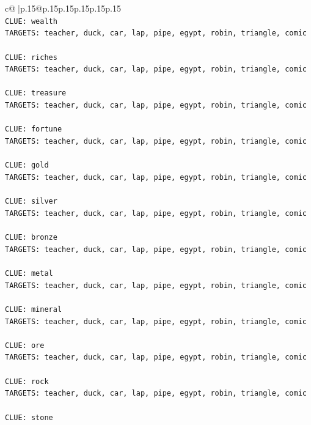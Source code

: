 \documentclass{article}
\begin{document}
{\begin{supertabular}{c@{$\;$}|p{.15\linewidth}@{}p{.15\linewidth}p{.15\linewidth}p{.15\linewidth}p{.15\linewidth}p{.15\linewidth}}
{{{\\ 
\texttt{CLUE: wealth} \\
\texttt{TARGETS: teacher, duck, car, lap, pipe, egypt, robin, triangle, comic} \\
\\ 
\texttt{CLUE: riches} \\
\texttt{TARGETS: teacher, duck, car, lap, pipe, egypt, robin, triangle, comic} \\
\\ 
\texttt{CLUE: treasure} \\
\texttt{TARGETS: teacher, duck, car, lap, pipe, egypt, robin, triangle, comic} \\
\\ 
\texttt{CLUE: fortune} \\
\texttt{TARGETS: teacher, duck, car, lap, pipe, egypt, robin, triangle, comic} \\
\\ 
\texttt{CLUE: gold} \\
\texttt{TARGETS: teacher, duck, car, lap, pipe, egypt, robin, triangle, comic} \\
\\ 
\texttt{CLUE: silver} \\
\texttt{TARGETS: teacher, duck, car, lap, pipe, egypt, robin, triangle, comic} \\
\\ 
\texttt{CLUE: bronze} \\
\texttt{TARGETS: teacher, duck, car, lap, pipe, egypt, robin, triangle, comic} \\
\\ 
\texttt{CLUE: metal} \\
\texttt{TARGETS: teacher, duck, car, lap, pipe, egypt, robin, triangle, comic} \\
\\ 
\texttt{CLUE: mineral} \\
\texttt{TARGETS: teacher, duck, car, lap, pipe, egypt, robin, triangle, comic} \\
\\ 
\texttt{CLUE: ore} \\
\texttt{TARGETS: teacher, duck, car, lap, pipe, egypt, robin, triangle, comic} \\
\\ 
\texttt{CLUE: rock} \\
\texttt{TARGETS: teacher, duck, car, lap, pipe, egypt, robin, triangle, comic} \\
\\ 
\texttt{CLUE: stone} \\
}}}
\end{supertabular}}
\end{document}
